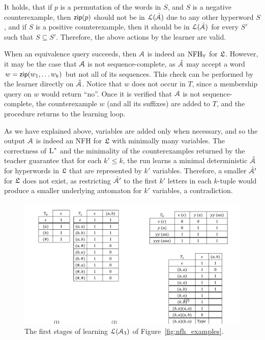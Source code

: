 It holds, that if $p$ is a permutation of the words in $S$, and $S$ is a negative counterexample, then $\mathsf{zip}(p)$ should not be in $\mathcal{L}(\hat{\mathcal{A}})$ due to any other hyperword $S$, and if $S$ is a positive counterexample, then it should be in $\mathcal{L}(\hat{\mathcal{A}})$ for every $S'$ such that $S\subseteq S'$. Therefore, the above actions by the learner are valid.  

When an equivalence query succeeds, then $\mathcal{A}$ is indeed an $\textrm{NFH}_{\forall}$ for $\mathfrak{L}$. However, it may be the case that $\mathcal{A}$ is not sequence-complete, as $\hat{\mathcal{A}}$ may accept a word $w = \mathsf{zip}(w_1,\ldots w_k)$ but not all of its sequences. This check can be performed by the learner directly on $\hat{\mathcal{A}}$. 
Notice that $w$ does not occur in $T$, since a membership query on $w$ would return ``no''. 
Once it is verified that $\mathcal{A}$ is not sequence-complete, the counterexample $w$ (and all its suffixes) are added to $T$, and the procedure returns to the learning loop.
 
As we have explained above, variables are added only when necessary, and so the output $\mathcal{A}$ is indeed an NFH for $\mathfrak{L}$ with minimally many variables. 
The correctness of $\textsc{L}^*$ and the minimality of the counterexamples returned by the teacher guarantee that for each $k'\leq k$, the run learns a minimal deterministic $\hat{\mathcal{A}}$ for hyperwords in $\mathfrak{L}$ that are represented by $k'$ variables. Therefore, a smaller $\hat{\mathcal{A}}'$ for $\mathfrak{L}$ does not exist, as restricting $\hat{\mathcal{A}}'$ to the first $k'$ letters in each $k$-tuple would produce a smaller underlying automaton for $k'$ variables, a contradiction. 

\begin{figure}[ht]
    \begin{center}
        \includegraphics[scale=0.5]{figures/learning_nfhf.pdf}
    \end{center}
    \caption{The first stages of learning $\mathcal{L}(\mathcal{A}_3)$ of Figure~\ref{fig:nfh_examples}.}
    \label{fig:learning_nfhf}
\end{figure}

